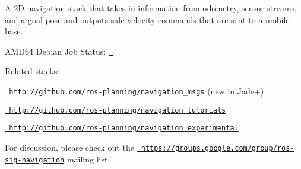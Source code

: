 A 2D navigation stack that takes in information from odometry, sensor streams, and a goal pose and outputs safe velocity commands that are sent to a mobile base.


\begin{DoxyItemize}
\item AMD64 Debian Job Status\+: \href{http://build.ros.org/job/Mbin_uB64__navigation__ubuntu_bionic_amd64__binary/}{\texttt{ }}
\end{DoxyItemize}

Related stacks\+:


\begin{DoxyItemize}
\item \href{http://github.com/ros-planning/navigation_msgs}{\texttt{ http\+://github.\+com/ros-\/planning/navigation\+\_\+msgs}} (new in Jade+)
\item \href{http://github.com/ros-planning/navigation_tutorials}{\texttt{ http\+://github.\+com/ros-\/planning/navigation\+\_\+tutorials}}
\item \href{http://github.com/ros-planning/navigation_experimental}{\texttt{ http\+://github.\+com/ros-\/planning/navigation\+\_\+experimental}}
\end{DoxyItemize}

For discussion, please check out the \href{https://groups.google.com/group/ros-sig-navigation}{\texttt{ https\+://groups.\+google.\+com/group/ros-\/sig-\/navigation}} mailing list. 